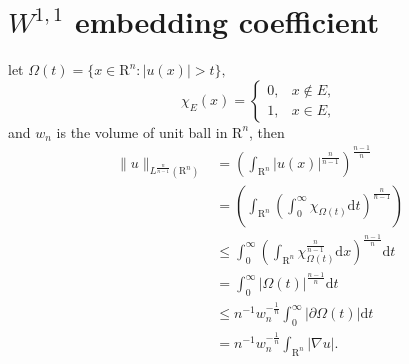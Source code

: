 \section{\texorpdfstring{$W^{1,1}$}{} embedding coefficient}
let $\Omega(t) = \{x\in\mathrm{R}^n : |u(x)| > t\},$ 
\begin{equation}
	\chi_E(x)=
	\begin{cases}
		0,& x\not\in E,\\
		1,& x\in E,
	\end{cases}
\end{equation}
and $w_n$ is the volume of unit ball in $\mathrm{R}^n$, then
\begin{equation}
	\begin{split}
		\|u\|_{L^{\frac{n}{n-1}}(\mathrm{R}^n)} &= \left(\int_{\mathrm{R}^n}|u(x)|^\frac{n}{n-1}\right)^{\frac{n-1}{n}}\\
		&= \left(\int_{\mathrm{R}^n}\left(\int_{0}^{\infty}\chi_{\Omega(t)}\mathrm{d}t\right)^{\frac{n}{n-1}}\right)\\
		&\leqslant \int_0^\infty\left(\int_{\mathrm{R}^n}\chi_{\Omega(t)}^{\frac{n}{n-1}}\mathrm{d}x\right)^{\frac{n-1}{n}}\mathrm{d}t\\
		&= \int_0^{\infty}|\Omega(t)|^{\frac{n-1}{n}}\mathrm{d}t\\
		&\leqslant n^{-1}w_n^{-\frac{1}{n}}\int_0^{\infty}|\partial\Omega(t)|\mathrm{d}t\\
		&= n^{-1}w_n^{-\frac{1}{n}} \int_{\mathrm{R}^n}|\nabla u|.
	\end{split}
\end{equation}


